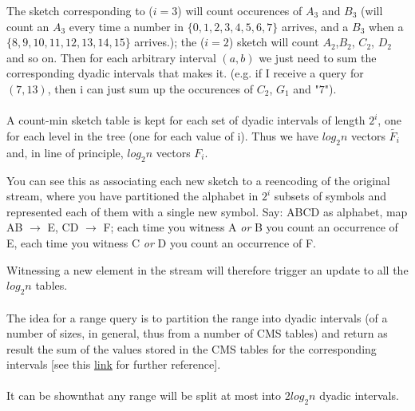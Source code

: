 \documentclass[a4paper]{article}
\begin{document}
The sketch corresponding to ($i=3$) will count occurences of $A_3$ and $B_3$ (will count an $A_3$ every time a number in $\{0,1,2,3,4,5,6,7\}$ arrives, and a $B_3$ when a $\{8,9,10,11,12,13,14,15\}$ arrives.); the ($i=2$) sketch will count $A_2$,$ B_2$, $C_2$, $D_2$ and so on.
Then for each arbitrary interval $(a, b)$ we just need to sum the corresponding dyadic intervals that makes it. (e.g. if I receive a query for $(7, 13)$, then i can just sum up the occurences of $C_2$, $G_1$ and "$7$").\\\\
A count-min sketch table is kept for each set of dyadic intervals of length $2^i$, one for each level in the tree (one for each value of i). Thus we have $log_2 n$ vectors $\widetilde{F_i}$ and, in line of principle, $log_2 n$ vectors $F_i$.

You can see this as associating each new sketch to a reencoding of the original stream, where you have partitioned the alphabet in $2^i$ subsets of symbols and represented each of them with a single new symbol.
Say: ABCD as alphabet, map AB $\rightarrow$ E, CD $\rightarrow$ F; each time you witness A \emph{or} B you count an occurrence of E, each time you witness C \emph{or} D you count an occurrence of F.

Witnessing a new element in the stream will therefore trigger an update to all the $log_2 n$ tables.
\\
\\
The idea for a range query is to partition the range into dyadic intervals (of a number of sizes, in general, thus from a number of CMS tables) and return as result the sum of the values stored in the CMS tables for the corresponding intervals [see this \href{http://dimacs.rutgers.edu/~graham/pubs/papers/cm-full.pdf}{link} for further reference].
\\
\\
It can be shown\footnotemark that any range will be split at most into $2log_2 n$ dyadic intervals.

\end{document}
